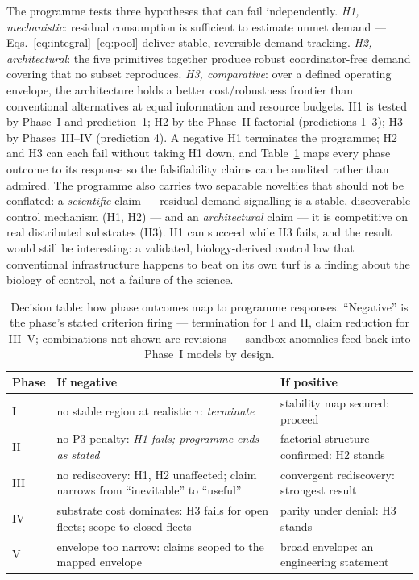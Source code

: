 \documentclass[twoside,twocolumn,usenatbib]{mnras}
\begin{document}
The programme tests three hypotheses that can fail independently.
\emph{H1, mechanistic}: residual consumption is sufficient to estimate
unmet demand --- Eqs.~\ref{eq:integral}--\ref{eq:pool} deliver stable,
reversible demand tracking. \emph{H2, architectural}: the five
primitives together produce robust coordinator-free demand covering
that no subset reproduces. \emph{H3, comparative}: over a defined
operating envelope, the architecture holds a better cost/robustness
frontier than conventional alternatives at equal information and
resource budgets. H1 is tested by Phase~I and prediction~1; H2 by the
Phase~II factorial (predictions 1--3); H3 by Phases~III--IV
(prediction 4). A negative H1 terminates the programme; H2 and H3 can
each fail without taking H1 down, and Table~\ref{tab:decisions} maps
every phase outcome to its response so the falsifiability claims can
be audited rather than admired. The programme also carries two
separable novelties that should not be conflated: a \emph{scientific}
claim --- residual-demand signalling is a stable, discoverable control
mechanism (H1, H2) --- and an \emph{architectural} claim --- it is
competitive on real distributed substrates (H3). H1 can succeed while
H3 fails, and the result would still be interesting: a validated,
biology-derived control law that conventional infrastructure happens
to beat on its own turf is a finding about the biology of control, not
a failure of the science.

\begin{table}
\centering
\caption{Decision table: how phase outcomes map to programme responses.
``Negative'' is the phase's stated criterion firing --- termination
for I and II, claim reduction for III--V; combinations not
shown are revisions --- sandbox anomalies feed back into Phase~I models
by design.}
\label{tab:decisions}
\footnotesize
\begin{tabular}{@{}lp{24mm}p{24mm}@{}}
\toprule
Phase & If negative & If positive \\
\midrule
I & no stable region at realistic $\tau$: \emph{terminate} & stability map secured: proceed \\
II & no P3 penalty: \emph{H1 fails; programme ends as stated} & factorial structure confirmed: H2 stands \\
III & no rediscovery: H1, H2 unaffected; claim narrows from ``inevitable'' to ``useful'' & convergent rediscovery: strongest result \\
IV & substrate cost dominates: H3 fails for open fleets; scope to closed fleets & parity under denial: H3 stands \\
V & envelope too narrow: claims scoped to the mapped envelope & broad envelope: an engineering statement \\
\bottomrule
\end{tabular}
\end{table}
\end{document}
